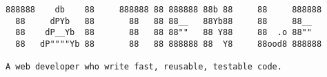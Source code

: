 \begin{verbatim}
888888    db    88     888888 88 888888 88b 88     88     888888
  88     dPYb   88       88   88 88__   88Yb88     88     88__
  88    dP__Yb  88       88   88 88""   88 Y88     88  .o 88""
  88   dP""""Yb 88       88   88 888888 88  Y8     88ood8 888888

A web developer who write fast, reusable, testable code.
\end{verbatim}